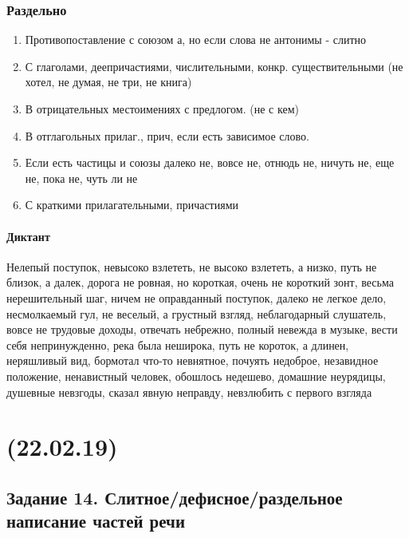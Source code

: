 \documentclass{article}
\begin{document}
\subsubsection{Раздельно}

\begin{enumerate}
\item
  Противопоставление с союзом а, но если слова не антонимы - слитно
\item
  С глаголами, деепричастиями, числительными, конкр. существительными (не хотел, не думая, не три, не книга)
\item
  В отрицательных местоимениях с предлогом. (не с кем)
\item
  В отглагольных прилаг., прич, если есть зависимое слово.
\item
  Если есть частицы и союзы далеко не, вовсе не, отнюдь не, ничуть не, еще не, пока не, чуть ли не
\item
  С краткими прилагательными, причастиями
\end{enumerate}

\paragraph{Диктант}
Нелепый поступок,
невысоко взлететь,
не высоко взлететь, а низко,
путь не близок, а далек,
дорога не ровная, но короткая,
очень не короткий зонт,
весьма нерешительный шаг,
ничем не оправданный поступок,
далеко не легкое дело,
несмолкаемый гул,
не веселый, а грустный взгляд,
неблагодарный слушатель,
вовсе не трудовые доходы,
отвечать небрежно,
полный невежда в музыке,
вести себя непринужденно,
река была неширока,
путь не короток, а длинен,
неряшливый вид,
бормотал что-то невнятное,
почуять недоброе,
незавидное положение,
ненавистный человек,
обошлось недешево,
домашние неурядицы,
душевные невзгоды,
сказал явную неправду,
невзлюбить с первого взгляда

\newpage
\noindent\makebox[\linewidth]{\rule{\paperwidth}{0.4pt}}
\section{(22.02.19)}
\noindent\makebox[\linewidth]{\rule{\paperwidth}{0.4pt}}

\subsection{Задание 14. Слитное/дефисное/раздельное написание частей речи}
\end{document}
